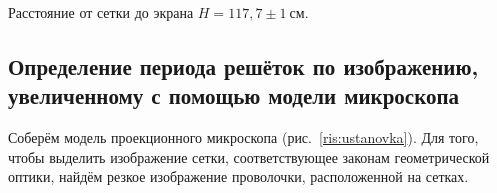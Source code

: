 \documentclass[a4paper, 12pt]{article}
\begin{document}
Расстояние от сетки до экрана $H = 117,7\pm1~см$.

\subsection{Определение периода решёток по изображению, увеличенному с помощью модели микроскопа}

Соберём модель проекционного микроскопа (рис.~\ref{ris:ustanovka}). Для того, чтобы выделить изображение сетки, соответствующее законам геометрической оптики, найдём резкое изображение проволочки, расположенной на сетках.

\begin{figure}[h!]
		\begin{minipage}[h!]{0.3\linewidth}
		\end{minipage}
		\hfill
		\begin{minipage}[h!]{0.3\linewidth}

\end{minipage}
\end{figure}
\end{document}
